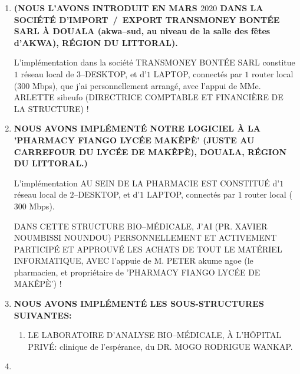 \begin{enumerate}[1.]
	\itemsep 0.75em
	\item {}
	 
		\textbf{(NOUS L'AVONS INTRODUIT EN MARS $2020$ DANS
		LA SOCI\'ET\'E D'IMPORT~/~EXPORT TRANSMONEY BONT\'EE SARL
		\`A DOUALA (akwa--sud, au niveau de la salle des f\^etes
		d'AKWA), R\'EGION DU LITTORAL).}
		
		L'implémentation dans la société TRANSMONEY BONTÉE SARL
		constitue $1$ réseau local de $3$--DESKTOP, et d'$1$ LAPTOP,
		connectés par $1$ router local ($300$ Mbps), que j'ai personnellement
		arrangé, avec l'appui de MMe. ARLETTE sibeufo (DIRECTRICE COMPTABLE
		ET FINANCIÈRE DE LA STRUCTURE) !
				
	\item {}
	
		\textbf{NOUS AVONS IMPL\'EMENT\'E NOTRE LOGICIEL \`A LA
		'PHARMACY FIANGO LYC\'EE MAK\^EP\`E' (JUSTE AU CARREFOUR
		DU LYC\'EE DE MAK\^EP\`E), DOUALA, R\'EGION DU LITTORAL.)}
		
		L'implémentation AU SEIN DE LA PHARMACIE EST CONSTITUÉ
		d'$1$ réseau local de $2$--DESKTOP, et d'$1$ LAPTOP,
		connectés par $1$ router local ($300$ Mbps).
		
		DANS CETTE STRUCTURE BIO--MÉDICALE, J'AI (PR. XAVIER NOUMBISSI
		NOUNDOU) PERSONNELLEMENT ET ACTIVEMENT PARTICIPÉ ET APPROUVÉ
		LES ACHATS DE TOUT LE MATÉRIEL INFORMATIQUE, AVEC l'appuie
		de M. PETER akume ngoe (le pharmacien, et propriétaire de
		'PHARMACY FIANGO LYCÉE DE MAKÊPÈ') !

	\item {}
	
		\textbf{NOUS AVONS IMPLÉMENTÉ LES SOUS-STRUCTURES SUIVANTES:}
		\begin{enumerate}[1.]
				\item LE LABORATOIRE D'ANALYSE BIO--MÉDICALE, À
				L'HÔPITAL PRIVÉ: clinique de l'espérance, du 
				DR. MOGO RODRIGUE WANKAP.
		\end{enumerate}

	\item {}	
\end{enumerate}
